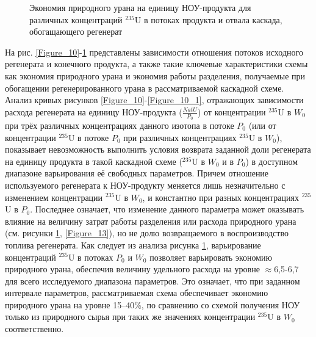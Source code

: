 \begin{figure}[ht]
  \caption{Экономия природного урана на единицу НОУ-продукта  для различных концентраций $^{235}$U в потоках продукта и отвала каскада, обогащающего регенерат}\label{fig:sc2_2}
\end{figure}

На рис. \ref{Figure_10}-\ref{fig:sc2_2} представлены зависимости отношения потоков исходного регенерата и конечного продукта, а также такие ключевые характеристики схемы как экономия природного урана и экономия работы разделения, получаемые при обогащении регенерированного урана в рассматриваемой каскадной схеме. 
Анализ кривых рисунков \ref{Figure_10}-\ref{Figure_10_1}, отражающих зависимости расхода регенерата на единицу НОУ-продукта ($\frac{NatU}{P_{0}}$) от концентрации $^{235}$U в $W_0$ при трёх различных концентрациях данного изотопа в потоке $P_0$ (или от концентрации $^{235}$U в потоке $P_0$ при различных концентрациях $^{235}$U в $W_0$), показывает невозможность выполнить условия возврата заданной доли регенерата на единицу продукта в такой каскадной схеме ($^{235}$U в $W_0$ и в $P_0$) в доступном диапазоне варьирования её свободных параметров. Причем отношение используемого регенерата к НОУ-продукту меняется лишь незначительно с изменением концентрации $^{235}$U в $W_0$, и константно при разных концентрациях $^{235}$U в $P_0$. Последнее означает, что изменение данного параметра может оказывать влияние на величину затрат работы разделения или расхода природного урана (см. рисунки \ref{fig:sc2_2}, \ref{Figure_13}), но не долю возвращаемого в воспроизводство топлива регенерата.
Как следует из анализа рисунка \ref{fig:sc2_2}, варьирование концентраций $^{235}$U в потоках $P_0$ и $W_0$ позволяет варьировать экономию природного урана, обеспечив величину удельного расхода на уровне $\approx$6,5-6,7 для всего исследуемого диапазона параметров. Это означает, что при заданном интервале параметров, рассматриваемая схема обеспечивает экономию природного урана на уровне 15--40\%, по сравнению со схемой получения НОУ только из природного сырья при таких же значениях концентрации $^{235}$U в $W_0$ соответственно.

